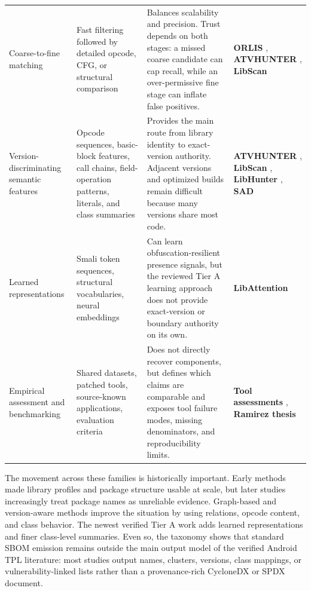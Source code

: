 \begin{longtable}{p{}p{}p{}p{}}
Coarse-to-fine matching &
Fast filtering followed by detailed opcode, CFG, or structural comparison &
Balances scalability and precision. Trust depends on both stages: a missed
coarse candidate can cap recall, while an over-permissive fine stage can
inflate false positives. &
\textbf{ORLIS} \cite{wang2018orlis}, \textbf{ATVHUNTER} \cite{zhan2021atvhunter}, \textbf{LibScan}
\cite{wu2023libscan}\\

Version-discriminating semantic features &
Opcode sequences, basic-block features, call chains, field-operation
patterns, literals, and class summaries &
Provides the main route from library identity to exact-version authority.
Adjacent versions and optimized builds remain difficult because many versions
share most code. &
\textbf{ATVHUNTER} \cite{zhan2021atvhunter}, \textbf{LibScan} \cite{wu2023libscan}, \textbf{LibHunter}
\cite{xie2024libhunter}, \textbf{SAD} \cite{zhou2025sad}\\

Learned representations &
Smali token sequences, structural vocabularies, neural embeddings &
Can learn obfuscation-resilient presence signals, but the reviewed Tier A
learning approach does not provide exact-version or boundary authority on its
own. &
\textbf{LibAttention} \cite{pan2025libattention}\\

Empirical assessment and benchmarking &
Shared datasets, patched tools, source-known applications, evaluation
criteria &
Does not directly recover components, but defines which claims are comparable
and exposes tool failure modes, missing denominators, and reproducibility
limits. &
\textbf{Tool assessments} \cite{zhan2020assessment,zhan2021systematic}, \textbf{Ramirez
thesis} \cite{ramirez2024empirical}\\
\end{longtable}
\endgroup

The movement across these families is historically important. Early methods
made library profiles and package structure usable at scale, but later
studies increasingly treat package names as unreliable evidence. Graph-based
and version-aware methods improve the situation by using relations, opcode
content, and class behavior. The newest verified Tier A work adds learned
representations and finer class-level summaries. Even so, the taxonomy shows
that standard SBOM emission remains outside the main output model of the
verified Android TPL literature: most studies output names, clusters,
versions, class mappings, or vulnerability-linked lists rather than a
provenance-rich CycloneDX or SPDX document.

